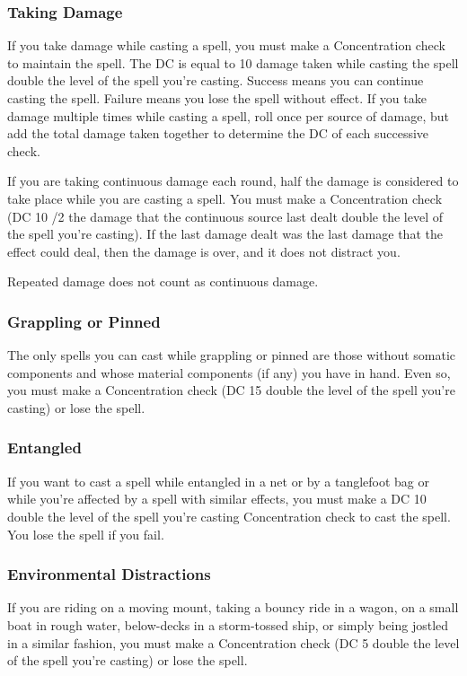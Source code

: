 \subsubsection{Taking Damage}
If you take damage while casting a spell, you must make a Concentration check to maintain the spell. The DC is equal to 10 \add damage taken while casting the spell \add double the level of the spell you're casting. Success means you can continue casting the spell. Failure means you lose the spell without effect. If you take damage multiple times while casting a spell, roll once per source of damage, but add the total damage taken together to determine the DC of each successive check.

If you are taking continuous damage each round, half the damage is considered to take place while you are casting a spell. You must make a Concentration check (DC 10 /2 the damage that the continuous source last dealt \add double the level of the spell you're casting). If the last damage dealt was the last damage that the effect could deal, then the damage is over, and it does not distract you.

Repeated damage does not count as continuous damage.

\subsubsection{Grappling or Pinned}

The only spells you can cast while grappling or pinned are those without somatic components and whose material components (if any) you have in hand. Even so, you must make a Concentration check (DC 15 \add double the level of the spell you're casting) or lose the spell.

\subsubsection{Entangled}
If you want to cast a spell while entangled in a net or by a tanglefoot bag or while you're affected by a spell with similar effects, you must make a DC 10 \add double the level of the spell you're casting Concentration check to cast the spell. You lose the spell if you fail.

\subsubsection{Environmental Distractions}

 If you are riding on a moving mount, taking a bouncy ride in a wagon, on a small boat in rough water, below-decks in a storm-tossed ship, or simply being jostled in a similar fashion, you must make a Concentration check (DC 5 \add double the level of the spell you're casting) or lose the spell.

